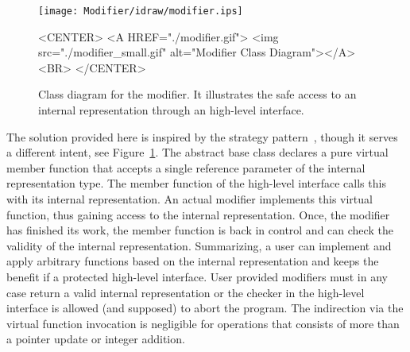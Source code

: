 \begin{figure}
\begin{ccTexOnly}
    \begin{center}
      \parbox{\textwidth}{%
          \texttt{[image: Modifier/idraw/modifier.ips]}%
      }
    \end{center}
\end{ccTexOnly}

    \caption{Class diagram for the modifier. It illustrates the
             safe access to an internal representation through an
             high-level interface.
    \label{figureModifierDesign}}

\begin{ccHtmlOnly}
    <CENTER>
    <A HREF="./modifier.gif">
        <img src="./modifier_small.gif" alt="Modifier Class Diagram"></A><BR>
    </CENTER>
\end{ccHtmlOnly}
\end{figure}

The solution provided here is inspired by the strategy
pattern~\cite{cgal:ghjv-dpero-95}, though it serves a different intent, see
Figure~\ref{figureModifierDesign}.  The abstract base class
 declares a pure virtual member function
 that accepts a single reference parameter of the
internal representation type. The member function  of
the high-level interface calls this  with its internal
representation.  An actual modifier implements this virtual function,
thus gaining access to the internal representation. Once, the modifier
has finished its work, the member function  is back in
control and can check the validity of the internal representation.
Summarizing, a user can implement and apply arbitrary functions based
on the internal representation and keeps the benefit if a protected
high-level interface. User provided modifiers must in any case return
a valid internal representation or the checker in the high-level
interface is allowed (and supposed) to abort the program. The
indirection via the virtual function invocation is negligible for
operations that consists of more than a pointer update or integer
addition.





\ccParDims
\beforecprogskip\parskip
{}



